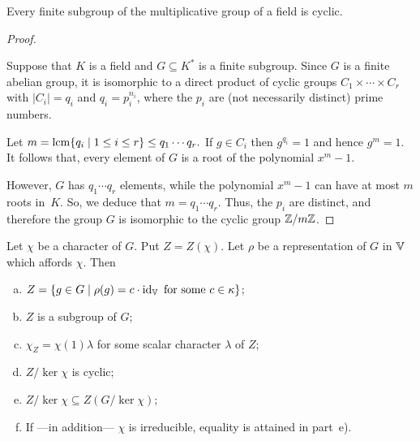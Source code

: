 \begin{lem}
    Every finite subgroup of the multiplicative group of a field is cyclic.
\end{lem}

\begin{proof} {\citep{1113402}}

    Suppose that $K$ is a field and $G\subseteq K^*$ is a finite subgroup. Since $G$ is a finite abelian group, it is isomorphic to a direct product of cyclic groups $C_1\times \cdots \times C_r$ with $|C_i|=q_i$ and $q_i=p_i^{n_i}$, where the $p_i$ are (not necessarily distinct) prime numbers.

    Let $m = \operatorname{lcm}\{q_i\mid 1\le i\le r\}\leq q_1\cdots q_r.$ If $g \in C_i$ then $g^{q_i}=1$ and hence $g^m=1$. It follows that, every element of $G$ is a root of the polynomial $x^m-1$.

    However, $G$ has $q_1\cdots q_r$ elements, while the polynomial $x^m-1$ can have at most $m$ roots in~$K$. So, we deduce that $m=q_1\cdots q_r$. Thus, the $p_i$ are distinct, and therefore the group $G$ is isomorphic to the cyclic group $\mathbb{Z}/m\mathbb{Z}$.
\end{proof}

\begin{thm}\label{thm:Z(chi)-properties}
    Let\/ $\chi$ be a character of\/ $G$. Put\/ $Z=Z(\chi)$. Let\/ $\rho$ be a representation of\/ $G$ in\/ $\mathbb V$ which affords\/ $\chi$. Then  
    \begin{enumerate}[a),font=\upshape]
        \item $Z = \{g\in G\mid\rho(g)=c\cdot\operatorname{id}_\mathbb V\text{ for some }c\in\kappa\}$;
        \item $Z$ is a subgroup of\/ $G$;
        \item $\chi_Z = \chi(1)\lambda$ for some scalar character\/ $\lambda$ of\/ $Z$;
        \item $Z/\ker \chi$ is cyclic;
        \item $Z/\ker \chi \subseteq Z(G/\ker \chi)$;
        \item If ---in addition--- $\chi$ is irreducible, equality is attained in part~{\rm e)}.
    \end{enumerate}
\end{thm}

